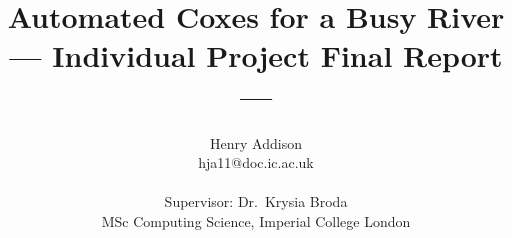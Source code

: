 \title{Automated Coxes for a Busy River\\\Large{--- Individual Project Final Report ---}}
\author{Henry Addison \\
       hja11@doc.ic.ac.uk\\ \\
       \small{Supervisor: Dr.\ Krysia Broda}\\
       \small{MSc Computing Science, Imperial College London}
}